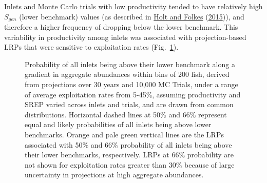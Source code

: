 \documentclass[11pt]{book}
\begin{document}
Inlets and Monte Carlo trials with low productivity tended to have relatively high \(S_{gen}\) (lower benchmark) values (as described in \protect\hyperlink{ref-holtCautionsUsingPercentilebased2015}{Holt and Folkes} (\protect\hyperlink{ref-holtCautionsUsingPercentilebased2015}{2015})), and therefore a higher frequency of dropping below the lower benchmark. This variability in productivity among inlets was associated with projection-based LRPs that were sensitive to exploitation rates (Fig.~\ref{fig:chinook-ProjLRPs-Even}).
\begin{figure}[htb]

{\centering {} 

}

\caption{Probability of all inlets being above their lower benchmark along a gradient in aggregate abundances within bins of 200 fish, derived from projections over 30 years and 10,000 MC Trials, under a range of average exploitation rates from 5-45\%, assuming productivity and SREP varied across inlets and trials, and are drawn from common distributions. Horizontal dashed lines at 50\% and 66\% represent equal and likely probabilities of all inlets being above lower benchmarks. Orange and pale green vertical lines are the LRPs associated with 50\% and 66\% probability of all inlets being above their lower benchmarks, respectively. LRPs at 66\% probability are not shown for exploitation rates greater than 30\% because of large uncertainty in projections at high aggregate abundances.}\label{fig:chinook-ProjLRPs-Even}
\end{figure}
\linebreak
\end{document}
